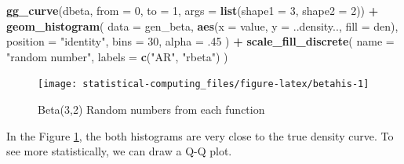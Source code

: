 \documentclass[]{book}
\newenvironment{Shaded}{\begin{snugshade}}{\end{snugshade}}
\newcommand{\DataTypeTok}[1]{\textcolor[rgb]{0.13,0.29,0.53}{#1}}
\newcommand{\DecValTok}[1]{\textcolor[rgb]{0.00,0.00,0.81}{#1}}
\newcommand{\FloatTok}[1]{\textcolor[rgb]{0.00,0.00,0.81}{#1}}
\newcommand{\KeywordTok}[1]{\textcolor[rgb]{0.13,0.29,0.53}{\textbf{#1}}}
\newcommand{\NormalTok}[1]{#1}
\newcommand{\OperatorTok}[1]{\textcolor[rgb]{0.81,0.36,0.00}{\textbf{#1}}}
\newcommand{\StringTok}[1]{\textcolor[rgb]{0.31,0.60,0.02}{#1}}
\theoremstyle{definition}
\theoremstyle{definition}
\theoremstyle{definition}
\theoremstyle{remark}
\begin{document}
\begin{Shaded}
\begin{Highlighting}[]
\KeywordTok{gg_curve}\NormalTok{(dbeta, }\DataTypeTok{from =} \DecValTok{0}\NormalTok{, }\DataTypeTok{to =} \DecValTok{1}\NormalTok{, }\DataTypeTok{args =} \KeywordTok{list}\NormalTok{(}\DataTypeTok{shape1 =} \DecValTok{3}\NormalTok{, }\DataTypeTok{shape2 =} \DecValTok{2}\NormalTok{)) }\OperatorTok{+}
\StringTok{  }\KeywordTok{geom_histogram}\NormalTok{(}
    \DataTypeTok{data =}\NormalTok{ gen_beta,}
    \KeywordTok{aes}\NormalTok{(}\DataTypeTok{x =}\NormalTok{ value, }\DataTypeTok{y =}\NormalTok{ ..density.., }\DataTypeTok{fill =}\NormalTok{ den),}
    \DataTypeTok{position =} \StringTok{"identity"}\NormalTok{,}
    \DataTypeTok{bins =} \DecValTok{30}\NormalTok{,}
    \DataTypeTok{alpha =} \FloatTok{.45}
\NormalTok{  ) }\OperatorTok{+}
\StringTok{  }\KeywordTok{scale_fill_discrete}\NormalTok{(}
    \DataTypeTok{name =} \StringTok{"random number"}\NormalTok{,}
    \DataTypeTok{labels =} \KeywordTok{c}\NormalTok{(}\StringTok{"AR"}\NormalTok{, }\StringTok{"rbeta"}\NormalTok{)}
\NormalTok{  )}
\end{Highlighting}
\end{Shaded}

\begin{figure}[H]

{\centering \texttt{[image: statistical-computing\_files/figure-latex/betahis-1]} 

}

\caption{Beta(3,2) Random numbers from each function}\label{fig:betahis}
\end{figure}

In the Figure \ref{fig:betahis}, the both histograms are very close to the true density curve. To see more statistically, we can draw a Q-Q plot.
\end{document}
